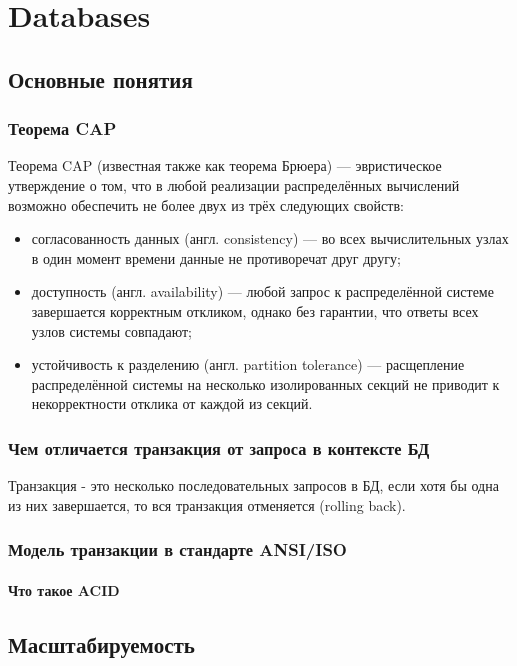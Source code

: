 \part{Databases}

\chapter{Основные понятия}

\section{Теорема CAP}

Теорема CAP (известная также как теорема Брюера) — эвристическое утверждение о том, что в любой реализации распределённых вычислений возможно обеспечить не более двух из трёх следующих свойств:
\begin{itemize}

\item согласованность данных (англ. consistency) — во всех вычислительных узлах в один момент времени данные не противоречат друг другу;
\item доступность (англ. availability) — любой запрос к распределённой системе завершается корректным откликом, однако без гарантии, что ответы всех узлов системы совпадают;
\item устойчивость к разделению (англ. partition tolerance) — расщепление распределённой системы на несколько изолированных секций не приводит к некорректности отклика от каждой из секций.

\end{itemize}

\section{Чем отличается транзакция от запроса в контексте БД}
Транзакция - это несколько последовательных запросов в БД, если хотя бы одна из них завершается, то вся транзакция отменяется (rolling back).

\section{Модель транзакции в стандарте ANSI/ISO}
\subsection{Что такое ACID}

\chapter{Масштабируемость}

